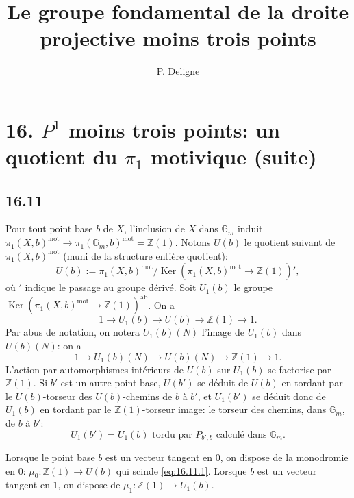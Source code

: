 \documentclass[12pt,a4paper]{article}
\title{Le groupe fondamental de la droite projective moins trois points}
\author{P. Deligne}
\date{}
\theoremstyle{plain}
\theoremstyle{definition}
\theoremstyle{remark}
\DeclareMathOperator{\Ker}{Ker}
\newcommand{\mot}{\mathrm{mot}}
\newcommand{\Gm}{\mathbb{G}_m}
\newcommand{\ZZ}{\mathbb{Z}}
\begin{document}
\maketitle


\section*{16. $P^1$ moins trois points: un quotient du $\pi_1$ motivique (suite)}

\subsection*{16.11}

Pour tout point base $b$ de $X$, l'inclusion de $X$ dans $\Gm$ induit
$\pi_1(X,b)^\mot \to \pi_1(\Gm,b)^\mot = \ZZ(1)$.
Notons $U(b)$ le quotient suivant de $\pi_1(X,b)^\mot$ (muni de la structure
enti\`ere quotient):
\begin{equation}\label{eq:16.11.0}
U(b) := \pi_1(X,b)^\mot / \Ker(\pi_1(X,b)^\mot \to \ZZ(1))',
\end{equation}
o\`u $'$ indique le passage au groupe d\'eriv\'e. Soit $U_1(b)$ le groupe
$\Ker(\pi_1(X,b)^\mot \to \ZZ(1))^{\mathrm{ab}}$. On a
\begin{equation}\label{eq:16.11.1}
1 \to U_1(b) \to U(b) \to \ZZ(1) \to 1.
\end{equation}
Par abus de notation, on notera $U_1(b)(N)$ l'image de $U_1(b)$ dans
$U(b)(N)$: on a
\begin{equation}\label{eq:16.11.2}
1 \to U_1(b)(N) \to U(b)(N) \to \ZZ(1) \to 1.
\end{equation}
L'action par automorphismes int\'erieurs de $U(b)$ sur $U_1(b)$ se factorise
par $\ZZ(1)$. Si $b'$ est un autre point base, $U(b')$ se d\'eduit de $U(b)$
en tordant par le $U(b)$-torseur des $U(b)$-chemins de $b$ \`a $b'$, et
$U_1(b')$ se d\'eduit donc de $U_1(b)$ en tordant par le $\ZZ(1)$-torseur
image: le torseur des chemins, dans $\Gm$, de $b$ \`a $b'$:
\begin{equation}\label{eq:16.11.3}
U_1(b') = U_1(b) \text{ tordu par } P_{b',b} \text{ calcul\'e dans } \Gm.
\end{equation}

Lorsque le point base $b$ est un vecteur tangent en $0$, on dispose de la
monodromie en $0$: $\mu_0 : \ZZ(1) \to U(b)$ qui scinde
\eqref{eq:16.11.1}. Lorsque $b$ est un vecteur tangent en $1$, on dispose de
$\mu_1 : \ZZ(1) \to U_1(b)$.
\end{document}
